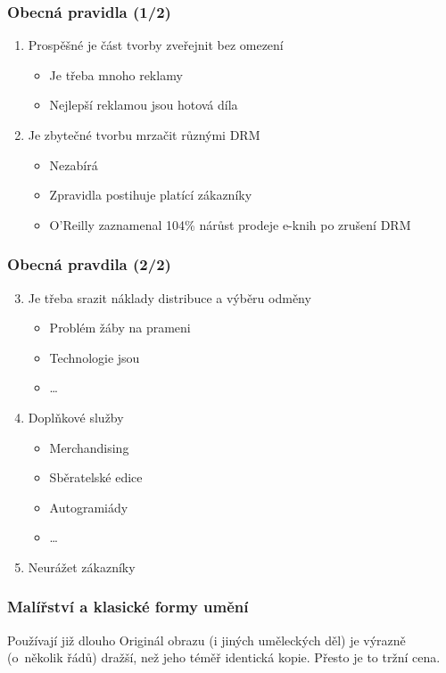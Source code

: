 \documentclass[xetex]{beamer}
\begin{document}
\begin{frame}
\frametitle{Obecná pravidla (1/2)}

	\begin{enumerate}
	\item Prospěšné je část tvorby zveřejnit bez omezení
		\begin{itemize}
		\item Je třeba mnoho reklamy 
		\item Nejlepší reklamou jsou hotová díla 
		\end{itemize}
	\item Je zbytečné tvorbu mrzačit různými DRM
		\begin{itemize}
		\item Nezabírá
		\item Zpravidla postihuje platící zákazníky
		\item O'Reilly zaznamenal 104\% nárůst prodeje e-knih po zrušení DRM
		\end{itemize}	

	\end{enumerate}
\end{frame}

\begin{frame}
\frametitle{Obecná pravdila (2/2)}
	
	\begin{enumerate}
		\setcounter{enumi}{2}
		\item Je třeba srazit náklady distribuce a výběru odměny
			\begin{itemize}
			\item Problém žáby na prameni
			\item Technologie jsou
			\item \ldots{}
			\end{itemize}
		\item Doplňkové služby
			\begin{itemize}
			\item Merchandising
			\item Sběratelské edice
			\item Autogramiády
			\item \ldots{}
			\end{itemize}
		\item Neurážet zákazníky
	\end{enumerate}

\end{frame}

\begin{frame}
\frametitle{Malířství a klasické formy umění}

\begin{block}{Používají již dlouho}
	Originál obrazu (i jiných uměleckých děl) je výrazně (o~několik řádů) dražší, než jeho téměř identická kopie. Přesto je to tržní cena.
\end{block}
\end{frame}
\end{document}
